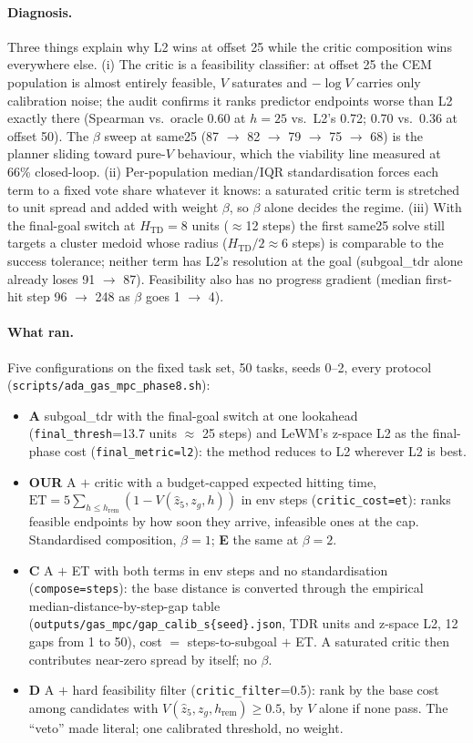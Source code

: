 \documentclass[11pt]{article}
\newcommand{\z}{z}
\newcommand{\Htd}{H_{\mathrm{TD}}}
\begin{document}
\paragraph{Diagnosis.} Three things explain why L2 wins at offset 25 while the critic composition
wins everywhere else. (i) The critic is a feasibility classifier: at offset 25 the CEM population is
almost entirely feasible, $V$ saturates and $-\log V$ carries only calibration noise; the audit
confirms it ranks predictor endpoints worse than L2 exactly there (Spearman vs.\ oracle 0.60 at
$h=25$ vs.\ L2's 0.72; 0.70 vs.\ 0.36 at offset 50). The $\beta$ sweep at same25 (87 $\to$ 82 $\to$
79 $\to$ 75 $\to$ 68) is the planner sliding toward pure-$V$ behaviour, which the viability line
measured at 66\% closed-loop. (ii) Per-population median/IQR standardisation forces each term to a
fixed vote share whatever it knows: a saturated critic term is stretched to unit spread and added
with weight $\beta$, so $\beta$ alone decides the regime. (iii) With the final-goal switch at
$\Htd=8$ units ($\approx$12 steps) the first same25 solve still targets a cluster medoid whose
radius ($\Htd/2\approx 6$ steps) is comparable to the success tolerance; neither term has L2's
resolution at the goal (subgoal\_tdr alone already loses 91 $\to$ 87). Feasibility also has no
progress gradient (median first-hit step 96 $\to$ 248 as $\beta$ goes 1 $\to$ 4).

\paragraph{What ran.} Five configurations on the fixed task set, 50 tasks, seeds 0--2, every
protocol (\texttt{scripts/ada\_gas\_mpc\_phase8.sh}):
\begin{itemize}[nosep]
  \item \textbf{A} subgoal\_tdr with the final-goal switch at one lookahead
        (\texttt{final\_thresh}=13.7 units $\approx$ 25 steps) and LeWM's z-space L2 as the
        final-phase cost (\texttt{final\_metric=l2}): the method reduces to L2 wherever L2 is
        best.
  \item \textbf{OUR} A $+$ critic with a budget-capped expected hitting time,
        $\mathrm{ET}=5\sum_{h\le h_{\mathrm{rem}}}(1-V(\hat\z_5,\z_g,h))$ in env steps
        (\texttt{critic\_cost=et}): ranks feasible endpoints by how soon they arrive, infeasible
        ones at the cap. Standardised composition, $\beta=1$; \textbf{E} the same at $\beta=2$.
  \item \textbf{C} A $+$ ET with both terms in env steps and no standardisation
        (\texttt{compose=steps}): the base distance is converted through the empirical
        median-distance-by-step-gap table (\texttt{outputs/gas\_mpc/gap\_calib\_s\{seed\}.json},
        TDR units and z-space L2, 12 gaps from 1 to 50), cost $=$ steps-to-subgoal $+$ ET. A
        saturated critic then contributes near-zero spread by itself; no $\beta$.
  \item \textbf{D} A $+$ hard feasibility filter (\texttt{critic\_filter}=0.5): rank by the base
        cost among candidates with $V(\hat\z_5,\z_g,h_{\mathrm{rem}})\ge 0.5$, by $V$ alone if
        none pass. The ``veto'' made literal; one calibrated threshold, no weight.
\end{itemize}
\end{document}
